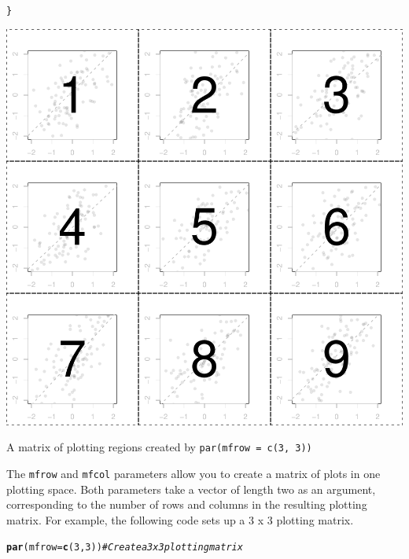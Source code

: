 \documentclass{tufte-book}\usepackage[]{graphicx}\usepackage[]{color}
\makeatletter
\def\maxwidth{ %
  \ifdim\Gin@nat@width>\linewidth
    \linewidth
  \else
    \Gin@nat@width
  \fi
}
\newcommand{\hlnum}[1]{\textcolor[rgb]{0.686,0.059,0.569}{#1}}%
\newcommand{\hlcom}[1]{\textcolor[rgb]{0.678,0.584,0.686}{\textit{#1}}}%
\newcommand{\hlstd}[1]{\textcolor[rgb]{0.345,0.345,0.345}{#1}}%
\newcommand{\hlkwc}[1]{\textcolor[rgb]{0.333,0.667,0.333}{#1}}%
\newcommand{\hlkwd}[1]{\textcolor[rgb]{0.737,0.353,0.396}{\textbf{#1}}}%
\newenvironment{kframe}{%
 \def\at@end@of@kframe{}%
 \ifinner\ifhmode%
  \def\at@end@of@kframe{\end{minipage}}%
  \begin{minipage}{\columnwidth}%
 \fi\fi%
 \def\FrameCommand##1{\hskip\@totalleftmargin \hskip-\fboxsep
 \colorbox{shadecolor}{##1}\hskip-\fboxsep
     \hskip-\linewidth \hskip-\@totalleftmargin \hskip\columnwidth}%
 \MakeFramed {\advance\hsize-\width
   \@totalleftmargin\z@ \linewidth\hsize
   \@setminipage}}%
 {\par\unskip\endMakeFramed%
 \at@end@of@kframe}
\newenvironment{knitrout}{}{} %
\makeatother
\begin{document}
\begin{marginfigure}
\begin{tiny}
\begin{knitrout}
\begin{kframe}
\begin{alltt}
\hlstd{\}}
\end{alltt}
\end{kframe}
\includegraphics[width=\maxwidth]{figure/unnamed-chunk-235-1} 

\end{knitrout}
\end{tiny}
\caption{A matrix of plotting regions created by \texttt{par(mfrow = c(3, 3))}}
\label{fig:mfrow}
\end{marginfigure}


The \texttt{mfrow} and \texttt{mfcol} parameters allow you to create a matrix of plots in one plotting space. Both parameters take a vector of length two as an argument, corresponding to the number of rows and columns in the resulting plotting matrix. For example, the following code sets up a 3 x 3 plotting matrix.

\begin{knitrout}
\color{fgcolor}\begin{kframe}
\begin{alltt}
\hlkwd{par}\hlstd{(}\hlkwc{mfrow} \hlstd{=} \hlkwd{c}\hlstd{(}\hlnum{3}\hlstd{,} \hlnum{3}\hlstd{))} \hlcom{# Create a 3 x 3 plotting matrix}
\end{alltt}
\end{kframe}
\end{knitrout}
\end{document}
